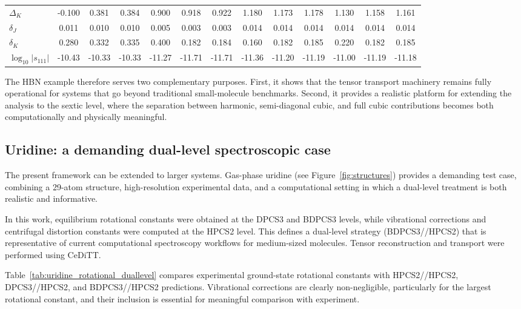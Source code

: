 \documentclass[aip,jcp,reprint,floatfix]{revtex4-2}
\begin{document}
\begin{table}[t]
\begin{tabular}{lccc ccc ccc ccc}
$\Delta_K$ & -0.100 & 0.381 & 0.384
& 0.900 & 0.918 & 0.922
& 1.180 & 1.173 & 1.178
& 1.130 & 1.158 & 1.161 \\

$\delta_J$ & 0.011 & 0.010 & 0.010
& 0.005 & 0.003 & 0.003
& 0.014 & 0.014 & 0.014
& 0.014 & 0.014 & 0.014 \\

$\delta_K$ & 0.280 & 0.332 & 0.335
& 0.400 & 0.182 & 0.184
& 0.160 & 0.182 & 0.185
& 0.220 & 0.182 & 0.185 \\

$\log_{10}|s_{111}|$ & -10.43 & -10.33 & -10.33
& -11.27 & -11.71 & -11.71
& -11.36 & -11.20 & -11.19
& -11.00 & -11.19 & -11.18 \\

\bottomrule
\end{tabular}

\label{table:hbn_main}
\end{table}

The HBN example therefore serves two complementary purposes. First, it
shows that the tensor transport machinery remains fully operational
for systems that go beyond traditional small-molecule benchmarks.
Second, it provides a realistic platform for extending the analysis to
the sextic level, where the separation between harmonic, semi-diagonal
cubic, and full cubic contributions becomes both computationally and
physically meaningful.


\subsection{Uridine: a demanding dual-level spectroscopic case}

The present framework can be extended to larger systems. Gas-phase
uridine (see Figure~\ref{fig:structures})
provides a demanding test case, combining a 29-atom structure, 
high-resolution experimental data, and a computational setting in 
which a dual-level treatment is both realistic and 
informative.\cite{uridine_2015}

In this work, equilibrium rotational constants were obtained at the
DPCS3 and BDPCS3 levels, while vibrational corrections and centrifugal
distortion constants were computed at the HPCS2 level. This defines a
dual-level strategy (BDPCS3//HPCS2) that is representative of current
computational spectroscopy workflows for medium-sized 
molecules.\cite{acr_2026} Tensor reconstruction and transport were 
performed using CeDiTT.

Table~\ref{tab:uridine_rotational_duallevel} compares experimental
ground-state rotational constants with HPCS2//HPCS2, DPCS3//HPCS2,
and BDPCS3//HPCS2 predictions. Vibrational corrections are clearly
non-negligible, particularly for the largest rotational constant, and
their inclusion is essential for meaningful comparison with
experiment.
\end{document}
